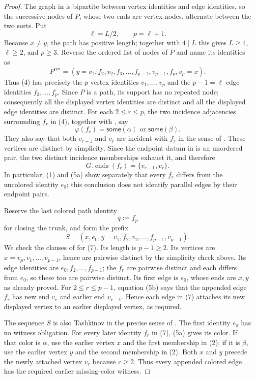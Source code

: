 \begin{proof}
The graph in  is bipartite between vertex
identities and edge identities, so the successive nodes of $P$, whose two
ends are vertex-nodes, alternate between the two sorts.  Put
\[
 \ell=L/2,\qquad p=\ell+1.
\]
Because $x\ne y$, the path has positive length; together with $4\mid L$
this gives $L\ge4$, $\ell\ge2$, and $p\ge3$.  Reverse the ordered list of
nodes of $P$ and name its identities as
\[
 P^{\mathrm{rev}}=(y=v_1,f_2,v_2,f_3,\ldots,
                    f_{p-1},v_{p-1},f_p,v_p=x).
\tag{4}
\]
Thus (4) has precisely the $p$ vertex identities
$v_1,\ldots,v_p$ and the $p-1=\ell$ edge identities
$f_2,\ldots,f_p$.  Since $P$ is a path, its support has no repeated node;
consequently all the displayed vertex identities are distinct and all the
displayed edge identities are distinct.  For each $2\le r\le p$, the two
incidence adjacencies surrounding $f_r$ in (4), together with
, say
\[
 \varphi(f_r)=\mathsf{some}(\alpha)
 \text{ or }\mathsf{some}(\beta).
\tag{5a}
\]
They also say that both $v_{r-1}$ and $v_r$ are incident with $f_r$ in
the sense of .  These vertices are distinct by
simplicity.  Since the endpoint datum in  is
an unordered pair, the two distinct incidence memberships exhaust it, and
therefore
\[
 G.\operatorname{ends}(f_r)=\{v_{r-1},v_r\}.
\tag{5b}
\]
In particular, (1) and (5a) show separately that every $f_r$ differs from
the uncolored identity $e_0$; this conclusion does not identify parallel
edges by their endpoint pairs.

Reserve the last colored path identity
\[
 q:=f_p
\tag{6}
\]
for closing the trunk, and form the prefix
\[
 S=(x,e_0,y=v_1,f_2,v_2,\ldots,f_{p-1},v_{p-1}).
\tag{7}
\]
We check the clauses of  for (7).  Its length is
$p-1\ge2$.  Its vertices are $x=v_p,v_1,\ldots,v_{p-1}$, hence are
pairwise distinct by the simplicity check above.  Its edge identities are
$e_0,f_2,\ldots,f_{p-1}$; the $f_r$ are pairwise distinct and each differs
from $e_0$, so these too are pairwise distinct.  Its first edge is $e_0$,
whose ends are $x,y$ as already proved.  For $2\le r\le p-1$, equation
(5b) says that the appended edge $f_r$ has new end $v_r$ and earlier end
$v_{r-1}$.  Hence each edge in (7) attaches its new displayed vertex to
an earlier displayed vertex, as required.

The sequence $S$ is also Tashkinov in the precise sense of
.  The first identity $e_0$ has no witness
obligation.  For every later identity $f_r$ in (7), (5a) gives its color.
If that color is $\alpha$, use the earlier vertex $x$ and the first
membership in (2); if it is $\beta$, use the earlier vertex $y$ and the
second membership in (2).  Both $x$ and $y$ precede the newly attached
vertex $v_r$ because $r\ge2$.  Thus every appended colored edge has the
required earlier missing-color witness.


\end{proof}
